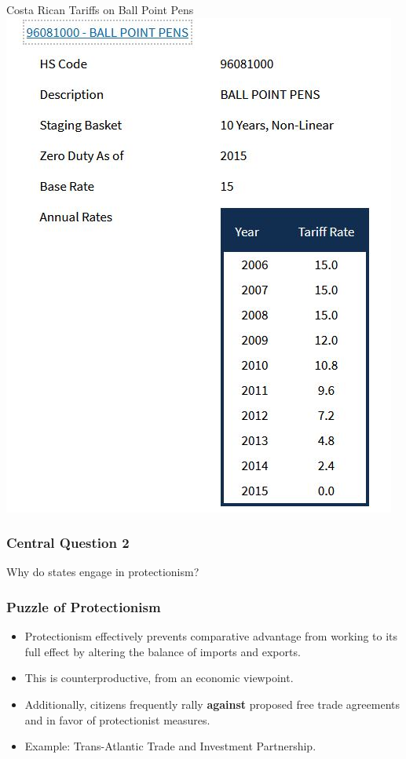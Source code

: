 \documentclass{beamer}
\begin{document}
\begin{frame}{\LARGE Costa Rican Tariffs on Ball Point Pens}
	\centering
	\includegraphics[width=\textwidth,height=0.8\textheight,keepaspectratio]{ball point pens.JPG}
\end{frame}


\begin{frame} 
	\frametitle{\LARGE{Central Question 2}}
	\centering
	\Large{Why do states engage in protectionism?}
\end{frame}


\begin{frame} 
	\frametitle{\LARGE{Puzzle of Protectionism}}
	\begin{itemize}
			\item Protectionism effectively prevents comparative advantage from working to its full effect by altering the balance of imports and exports. \pause
			\item This is counterproductive, from an economic viewpoint. \pause
			\item Additionally, citizens frequently rally \textbf{against} proposed free trade agreements and in favor of protectionist measures.
			\item Example: Trans-Atlantic Trade and Investment Partnership.
	\end{itemize}
\end{frame}
\end{document}
